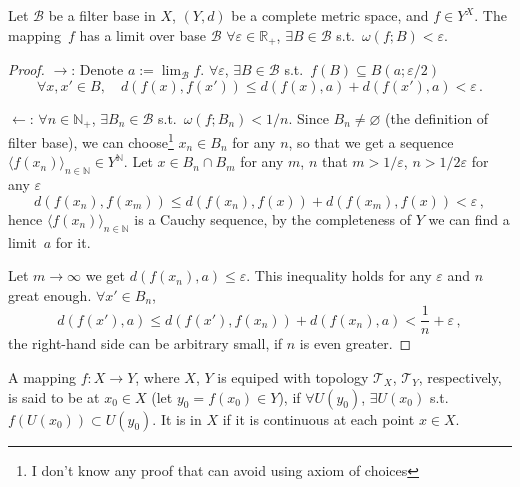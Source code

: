\documentclass[openany]{book}
\begin{document}
\begin{theorem}
	\label{theorem: Cauchy criterion of existance of limit}
	Let $\mathscr B$ be a filter base in $X$, $(Y, d)$ be a complete metric space, and $f \in Y^X$.
	The mapping~$f$ has a limit over base $\mathscr B$ 
	$\forall \varepsilon \in \mathbb R_+$, $\exists B \in \mathscr B$ s.t.\ $\omega(f; B) < \varepsilon$.
\end{theorem}
\begin{proof}
	$\to$:
	Denote $a := \lim_{\mathscr B} f$.
	$\forall \varepsilon$, $\exists B \in \mathscr B$ s.t.\ $f(B) \subseteq B(a; \varepsilon/2)$
	\begin{equation*}
		\forall x, x' \in B,\quad
		d(f(x), f(x')) \leq d(f(x), a) + d(f(x'), a) < \varepsilon\,.
	\end{equation*}

	$\gets$:
	$\forall n \in \mathbb N_+$, $\exists B_n \in \mathscr B$ s.t.\ $\omega(f; B_n) < 1/n$. 
	Since $B_n \neq \varnothing$ (the definition of filter base), we can choose\footnote{I don't know any proof that can avoid using axiom of choices} $x_n \in B_n$ for any $n$, so that we get a sequence $\langle f(x_n) \rangle_{n \in \mathbb N} \in Y^\mathbb N$. Let $x \in B_n \cap B_m$ for any $m$, $n$ that $m > 1/\varepsilon$, $n > 1/ 2\varepsilon$ for any $\varepsilon$
	\begin{equation*}
		d(f(x_n), f(x_m)) \leq d(f(x_n), f(x)) + d(f(x_m), f(x)) < \varepsilon\,,
	\end{equation*}
	hence $\langle f(x_n) \rangle_{n \in \mathbb N}$ is a Cauchy sequence, by the completeness of $Y$ we can find a limit~$a$ for it.

	Let $m \to \infty$ we get $d(f(x_n), a) \leq \varepsilon$. This inequality holds for any $\varepsilon$ and $n$ great enough.
	$\forall x' \in B_n$,
	\begin{equation*}
		d(f(x'), a) \leq d(f(x'), f(x_n)) + d(f(x_n), a)
		< \frac 1 n + \varepsilon\,,
	\end{equation*}
	the right-hand side can be arbitrary small, if $n$ is even greater.
\end{proof}

\begin{definition}[Continuity]
		\label{definition: continuous}
	A mapping $f \colon X \to Y$, where $X$, $Y$ is equiped with topology $\mathscr T_X$, $\mathscr T_Y$, respectively, is said to be  at $x_0 \in X$ (let $y_0 = f( x_0 ) \in Y$), if $\forall U( y_0 )$, $\exists U( x_0 )$ s.t. $f( U(x_0) )\subset U( y_0 )$. 
	It is  in $X$ if it is continuous at each point $x \in X$. 
\end{definition}
\end{document}
